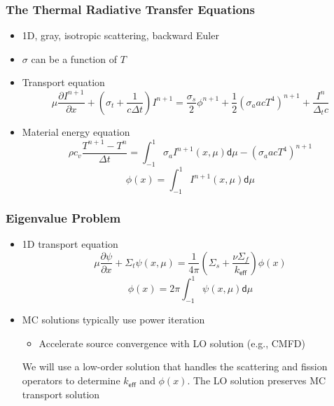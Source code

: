 \documentclass[xcolor=dvipsnames,handout]{beamer}
\newcommand{\keff}[0]{\ensuremath{{k}_{\textsf{eff}}} }
\newcommand{\colb}[1]{{\color{blue} #1}}
\newlength{\wideitemsep}
\let\olditem\item
\renewcommand{\item}{\setlength{\itemsep}{\wideitemsep}\olditem}
\newcommand{\pderiv}[2]{\frac{\partial #1}{\partial #2}}
\renewcommand{\d}{\mathsf{d}}
\begin{document}
\begin{frame}
    \frametitle{The Thermal Radiative Transfer Equations}
    \begin{itemize}
        \item 1D, gray, isotropic scattering, backward Euler 
        \item $\sigma$ can be a function of $T$
        \item \colb{Transport} equation
    \begin{equation*}
\mu \pderiv{I^{n+1}}{x} + \left(\sigma_t + \frac{1}{c \Delta t }\right) I^{n+1}
= \frac{\sigma_s}{2} \phi^{n+1} +\frac{1}{2} \left(\sigma_a a c T^4
\right)^{n+1} + \frac{I^n}{\Delta_t c}  
    \end{equation*}
    \pause
    \vspace{-0.2in}
\item \colb{Material energy} equation
        \begin{equation*}
\rho c_v \frac{T^{n+1} - T^n}{\Delta t} = \int_{-1}^{1} \sigma_a I^{n+1}(x,\mu)
\d\mu - \left(\sigma_a a c T^4\right)^{n+1} 
    \end{equation*}
\begin{equation*}
    \phi(x) = \int_{-1}^1 I^{n+1}(x,\mu) \d\mu
\end{equation*}
\end{itemize}
\end{frame}

\begin{frame}
    \frametitle{Eigenvalue Problem}
    \begin{itemize}
        \item 1D transport equation
    \begin{equation*}
    \mu \pderiv{\psi}{x} + \Sigma_t \psi(x,\mu)
    = \frac{1}{4\pi}\left(\Sigma_s  + \frac{\nu \Sigma_f}{\keff} 
    \right) \phi(x)
    \end{equation*}
    \pause
    \vspace{-0.2in}
\begin{equation*}
    \phi(x) = 2 \pi \int_{-1}^1 \psi(x,\mu) \d\mu
\end{equation*}
    \item MC solutions typically use power iteration
        \begin{itemize}
            \item Accelerate source convergence with LO solution (e.g., CMFD)
        \end{itemize}
        \begin{block}{} We will use a low-order solution that handles the scattering
        and fission operators to determine $\keff$ and $\phi(x)$. The LO solution preserves MC transport solution\end{block}
\end{itemize}
\end{frame}
\end{document}

